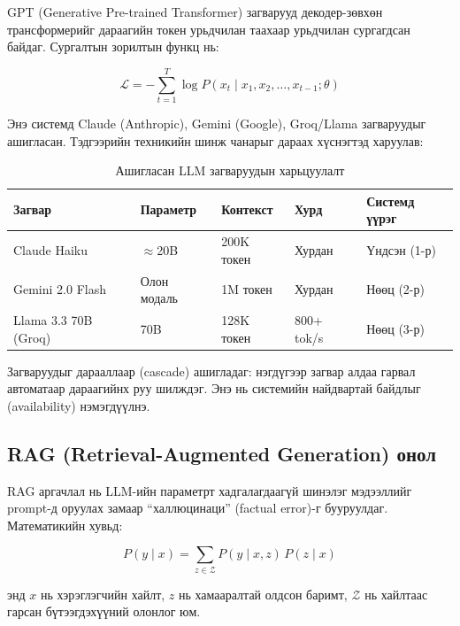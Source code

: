 \documentclass[12pt,a4paper]{report}
\begin{document}
GPT (Generative Pre-trained Transformer) загварууд \cite{brown2020gpt3} декодер-зөвхөн трансформерийг дараагийн токен урьдчилан таахаар урьдчилан сургагдсан байдаг. Сургалтын зорилтын функц нь:

\begin{equation}
\mathcal{L} = -\sum_{t=1}^{T} \log P(x_t \mid x_1, x_2, \ldots, x_{t-1}; \theta)
\label{eq:lm_loss}
\end{equation}

Энэ системд Claude (Anthropic), Gemini (Google), Groq/Llama загваруудыг ашигласан. Тэдгээрийн техникийн шинж чанарыг дараах хүснэгтэд харуулав:

\begin{table}[H]
\centering
\caption{Ашигласан LLM загваруудын харьцуулалт}
\label{tab:llm_compare}
\begin{tabularx}{\textwidth}{@{}lXXXX@{}}
\toprule
\textbf{Загвар} & \textbf{Параметр} & \textbf{Контекст} & \textbf{Хурд} & \textbf{Системд үүрэг} \\
\midrule
Claude Haiku & $\approx$20B & 200K токен & Хурдан & Үндсэн (1-р) \\
Gemini 2.0 Flash & Олон модаль & 1M токен & Хурдан & Нөөц (2-р) \\
Llama 3.3 70B (Groq) & 70B & 128K токен & 800+ tok/s & Нөөц (3-р) \\
\bottomrule
\end{tabularx}
\end{table}

Загваруудыг дарааллаар (cascade) ашигладаг: нэгдүгээр загвар алдаа гарвал автоматаар дараагийнх руу шилждэг. Энэ нь системийн найдвартай байдлыг (availability) нэмэгдүүлнэ.

\subsection{RAG (Retrieval-Augmented Generation) онол}

RAG аргачлал \cite{lewis2020rag} нь LLM-ийн параметрт хадгалагдаагүй шинэлэг мэдээллийг prompt-д оруулах замаар ``халлюцинаци'' (factual error)-г бууруулдаг. Математикийн хувьд:

\begin{equation}
P(y \mid x) = \sum_{z \in \mathcal{Z}} P(y \mid x, z)\, P(z \mid x)
\label{eq:rag}
\end{equation}

\noindent энд $x$ нь хэрэглэгчийн хайлт, $z$ нь хамааралтай олдсон баримт, $\mathcal{Z}$ нь хайлтаас гарсан бүтээгдэхүүний олонлог юм.
\end{document}
